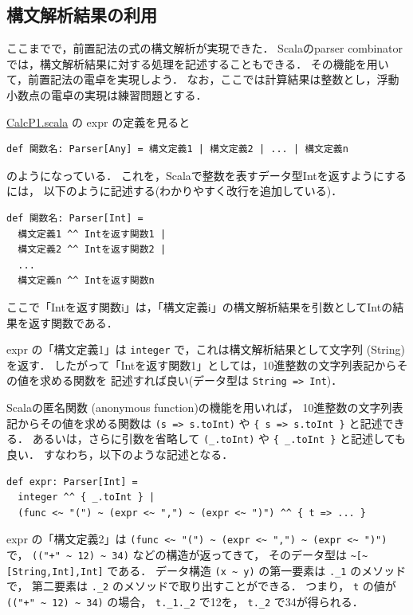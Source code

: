 \documentclass[a4j]{jsarticle}
\begin{document}
\subsection{構文解析結果の利用}
\label{sec-4-3}

ここまでで，前置記法の式の構文解析が実現できた．
Scalaのparser combinatorでは，構文解析結果に対する処理を記述することもできる．
その機能を用いて，前置記法の電卓を実現しよう．
なお，ここでは計算結果は整数とし，浮動小数点の電卓の実現は練習問題とする．

\href{file:///home/tamura/lect2/ProLang/2018/org/prog/parser/CalcP1.scala}{CalcP1.scala} の expr の定義を見ると

\begin{verbatim}
def 関数名: Parser[Any] = 構文定義1 | 構文定義2 | ... | 構文定義n
\end{verbatim}
のようになっている．
これを，Scalaで整数を表すデータ型Intを返すようにするには，
以下のように記述する(わかりやすく改行を追加している)．

\begin{verbatim}
def 関数名: Parser[Int] =
  構文定義1 ^^ Intを返す関数1 |
  構文定義2 ^^ Intを返す関数2 |
  ...
  構文定義n ^^ Intを返す関数n
\end{verbatim}
ここで「Intを返す関数i」は，「構文定義i」の構文解析結果を引数としてIntの結果を返す関数である．

expr の「構文定義1」は \texttt{integer} で，これは構文解析結果として文字列 (String)を返す．
したがって「Intを返す関数1」としては，10進整数の文字列表記からその値を求める関数を
記述すれば良い(データ型は \verb~String => Int~)．

Scalaの匿名関数 (anonymous function)の機能を用いれば，
10進整数の文字列表記からその値を求める関数は \texttt{(s => s.toInt)} や
 \texttt{\{ s => s.toInt \}} と記述できる．
あるいは，さらに引数を省略して \texttt{(\_.toInt)} や \texttt{\{ \_.toInt \}} と記述しても良い．
すなわち，以下のような記述となる．

\begin{verbatim}
def expr: Parser[Int] =
  integer ^^ { _.toInt } |
  (func <~ "(") ~ (expr <~ ",") ~ (expr <~ ")") ^^ { t => ... }
\end{verbatim}

expr の「構文定義2」は \texttt{(func <\textasciitilde{} "(") \textasciitilde{} (expr <\textasciitilde{} ",") \textasciitilde{} (expr <\textasciitilde{} ")")} で，
\texttt{(("+" \textasciitilde{} 12) \textasciitilde{} 34)} などの構造が返ってきて，
そのデータ型は \texttt{\textasciitilde{}[\textasciitilde{}[String,Int],Int]} である．
データ構造 \texttt{(x \textasciitilde{} y)} の第一要素は \texttt{.\_1} のメソッドで，
第二要素は \texttt{.\_2} のメソッドで取り出すことができる．
つまり， \texttt{t} の値が \texttt{(("+" \textasciitilde{} 12) \textasciitilde{} 34)} の場合，
\texttt{t.\_1.\_2} で12を， \texttt{t.\_2} で34が得られる．
\end{document}
